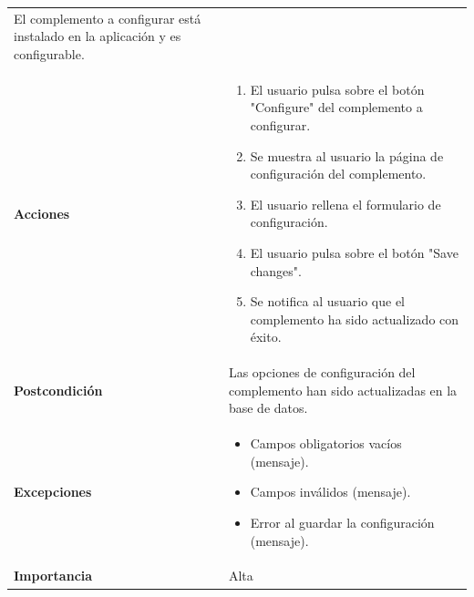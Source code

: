 \documentclass[
]{article}
\providecommand{\tightlist}{%
  \setlength{\itemsep}{0pt}\setlength{\parskip}{0pt}}
\begin{document}
\begin{longtable}[]{@{}ll@{}}
\begin{minipage}[t]{0.73\columnwidth}
El complemento a configurar está instalado en la aplicación y es
configurable.\strut
\end{minipage}\tabularnewline
\begin{minipage}[t]{0.21\columnwidth}\raggedright
\textbf{Acciones}\strut
\end{minipage} & \begin{minipage}[t]{0.73\columnwidth}\raggedright
\begin{enumerate}
\def\labelenumi{\arabic{enumi}.}
\tightlist
\item
  El usuario pulsa sobre el botón "Configure" del complemento a
  configurar.
\item
  Se muestra al usuario la página de configuración del complemento.
\item
  El usuario rellena el formulario de configuración.
\item
  El usuario pulsa sobre el botón "Save changes".
\item
  Se notifica al usuario que el complemento ha sido actualizado con
  éxito.
\end{enumerate}\strut
\end{minipage}\tabularnewline
\begin{minipage}[t]{0.21\columnwidth}\raggedright
\textbf{Postcondición}\strut
\end{minipage} & \begin{minipage}[t]{0.73\columnwidth}\raggedright
Las opciones de configuración del complemento han sido actualizadas en
la base de datos.\strut
\end{minipage}\tabularnewline
\begin{minipage}[t]{0.21\columnwidth}\raggedright
\textbf{Excepciones}\strut
\end{minipage} & \begin{minipage}[t]{0.73\columnwidth}\raggedright
\begin{itemize}
\tightlist
\item
  Campos obligatorios vacíos (mensaje).
\item
  Campos inválidos (mensaje).
\item
  Error al guardar la configuración (mensaje).
\end{itemize}\strut
\end{minipage}\tabularnewline
\begin{minipage}[t]{0.21\columnwidth}\raggedright
\textbf{Importancia}\strut
\end{minipage} & \begin{minipage}[t]{0.73\columnwidth}\raggedright
Alta\strut
\end{minipage}\tabularnewline
\bottomrule
\end{longtable}
\end{document}
